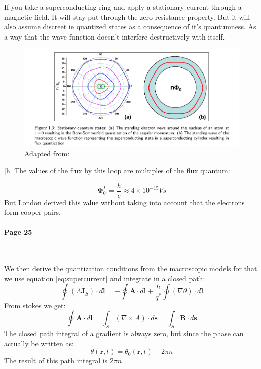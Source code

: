 \documentclass[12pt]{article}
\numberwithin{equation}{subsection}
\newcommand\ask[1]{
{\color{red}
#1
}
}
\newcommand\page[1]{
{
\color{blue}\paragraph{
Page #1
}\mbox{}\\
}
}
\begin{document}
If you take a superconducting ring and apply a stationary current through a magnetic field. It will stay put through the zero resistance property. But it will also assume discreet ie quantized states as a consequence of it's quantumness. As a way that the wave function doesn't interfere destructively with itself. 
\begin{figure}[h]
\includegraphics[scale=1.6]{images/flux-quantization.png}
\caption{Adapted from: \cite{gross2016applied}}
\end{figure}[h]
The values of the flux by this loop are multiples of the flux quantum:

\begin{equation}
    \mathbf{\Phi}^L_0 = \frac{h}{e} \approx 4\times 10^{-15} Vs
\end{equation}
But London derived this value without taking into account that the electrons form cooper pairs.
\page{25}
We then derive the quantization conditions from the macroscopic models for that we use equation \ref{eq:supercurrent} and integrate in a closed path:
\begin{equation}
    \oint (\Lambda \mathbf{J}_S) \cdot d\mathbf{l}  = -\oint \mathbf{A} \cdot d\mathbf{l} +\frac{\hbar}{q^*}\oint (\nabla \theta) \cdot d\mathbf{l}
    \label{eq:pathint}
\end{equation}
From stokes we get:
\begin{equation}
\oint \mathbf{A} \cdot d\mathbf{l} = \int_S(\nabla \times A)\cdot d\mathbf{s} = \int_S \mathbf{B}\cdot d\mathbf{s}
\end{equation}
The closed path integral of a gradient is always zero, but since the phase can actually be written as:
\begin{equation}
    \theta(\mathbf{r}, t) =     \theta_0(\mathbf{r}, t) +2\pi n
\end{equation}
The result of this path integral is $2\pi n$
\end{document}
